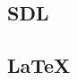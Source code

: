 \documentclass[11pt,a4paper,titlepage, oneside]{article}
\begin{document}
	\subsection*{{\color{blue}SDL}}
		\paragraph{}
			
			
	\subsection*{{\color{blue}LaTeX}}
		\paragraph{}
	
%
%
%
%
%
%
%
%
%
%    
%
%   
%
%
\end{document}
